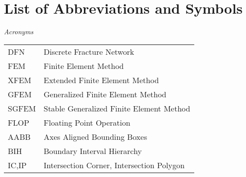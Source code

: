 \chapter*{List of Abbreviations and Symbols}

\noindent\emph{Acronyms}
\vspace{0.5cm}

\begin{tabularx}{0.9\linewidth}{@{}lX@{}}
DFN & Discrete Fracture Network \\
FEM & Finite Element Method \\
XFEM & Extended Finite Element Method \\
GFEM & Generalized Finite Element Method \\
SGFEM & Stable Generalized Finite Element Method \\
FLOP & Floating Point Operation \\
AABB & Axes Aligned Bounding Boxes \\
BIH & Boundary Interval Hierarchy \\
IC,IP & Intersection Corner, Intersection Polygon\\
\end{tabularx}
\pagebreak

